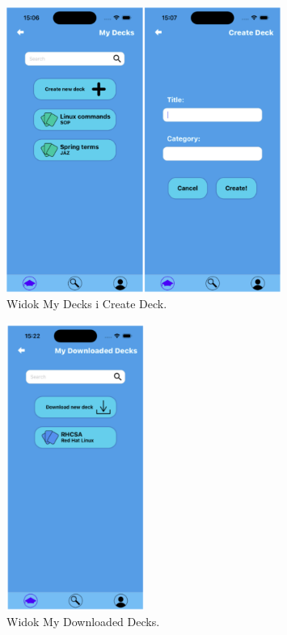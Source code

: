 \begin{figure}[H]
    \centering
    \includegraphics[width=0.8\textwidth]{chapters/chapter_10/images_mobile/mobile_my_decks}
    \caption{Widok My Decks i Create Deck.}
    \label{img:mobile_my_decks}
\end{figure}


\begin{figure}[H]
    \centering
    \includegraphics[width=0.4\textwidth]{chapters/chapter_10/images_mobile/mobile_my_decks_2}
    \caption{Widok My Downloaded Decks.}
    \label{img:mobile_my_decks_2}
\end{figure}


